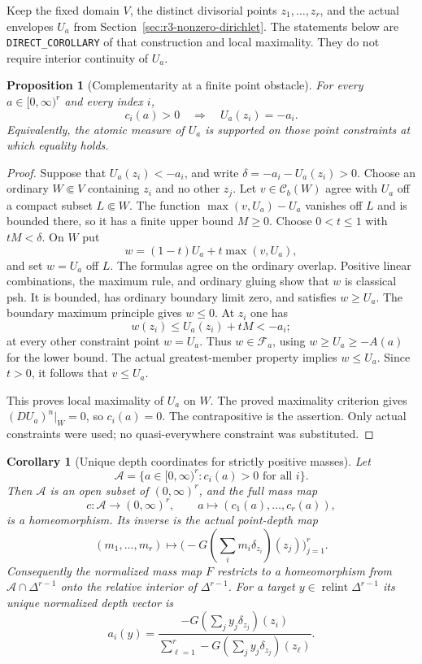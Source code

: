 \documentclass[11pt,a4paper]{article}
\numberwithin{equation}{section}
\newtheorem{proposition}[theorem]{Proposition}
\newtheorem{corollary}[theorem]{Corollary}
\theoremstyle{definition}
\theoremstyle{remark}
\newcommand{\Cb}{\mathcal C_b}
\begin{document}
Keep the fixed domain $V$, the distinct divisorial points
$z_1,\ldots,z_r$, and the actual envelopes $U_a$ from
Section~\ref{sec:r3-nonzero-dirichlet}. The statements below are
\texttt{DIRECT\_COROLLARY} of that construction and local maximality.
They do not require interior continuity of $U_a$.

\begin{proposition}[Complementarity at a finite point obstacle]
\label{prop:r3-atomic-complementarity}
For every $a\in[0,\infty)^r$ and every index $i$,
\[
 c_i(a)>0\quad\Longrightarrow\quad U_a(z_i)=-a_i.
\]
Equivalently, the atomic measure of $U_a$ is supported on those
point constraints at which equality holds.
\end{proposition}

\begin{proof}
Suppose that $U_a(z_i)<-a_i$, and write
$\delta=-a_i-U_a(z_i)>0$. Choose an ordinary
$W\Subset V$ containing $z_i$ and no other $z_j$. Let
$v\in\Cb(W)$ agree with $U_a$ off a compact subset
$L\Subset W$. The function $\max(v,U_a)-U_a$ vanishes off
$L$ and is bounded there, so it has a finite upper bound $M\geq0$.
Choose $0<t\leq1$ with $tM<\delta$. On $W$ put
\[
 w=(1-t)U_a+t\max(v,U_a),
\]
and set $w=U_a$ off $L$. The formulas agree on the ordinary
overlap. Positive linear combinations, the maximum rule, and
ordinary gluing show that $w$ is classical psh. It is bounded,
has ordinary boundary limit zero, and satisfies $w\geq U_a$.
The boundary maximum principle gives $w\leq0$.
At $z_i$ one has
\[
 w(z_i)\leq U_a(z_i)+tM<-a_i;
\]
at every other constraint point $w=U_a$. Thus
$w\in\mathcal F_a$, using $w\geq U_a\geq-A(a)$ for the
lower bound. The actual greatest-member property implies
$w\leq U_a$. Since $t>0$, it follows that $v\leq U_a$.

This proves local maximality of $U_a$ on $W$. The proved
maximality criterion gives $(DU_a)^n|_W=0$, so $c_i(a)=0$.
The contrapositive is the assertion. Only actual constraints
were used; no quasi-everywhere constraint was substituted.
\end{proof}

\begin{corollary}[Unique depth coordinates for strictly positive masses]
\label{cor:r3-active-mass-homeomorphism}
Let
\[
 \mathcal A=\{a\in[0,\infty)^r:c_i(a)>0\text{ for all }i\}.
\]
Then $\mathcal A$ is an open subset of $(0,\infty)^r$, and
the full mass map
\[
 c:\mathcal A\longrightarrow(0,\infty)^r,
 \qquad a\longmapsto(c_1(a),\ldots,c_r(a)),
\]
is a homeomorphism. Its inverse is the actual point-depth map
\[
 (m_1,\ldots,m_r)\longmapsto
 \bigl(-G(\textstyle\sum_i m_i\delta_{z_i})(z_j)\bigr)_{j=1}^r.
\]
Consequently the normalized mass map $F$ restricts to a
homeomorphism from $\mathcal A\cap\Delta^{r-1}$ onto the
relative interior of $\Delta^{r-1}$. For a target
$y\in\operatorname{relint}\Delta^{r-1}$ its unique normalized
depth vector is
\[
 a_i(y)=
 \frac{-G(\sum_jy_j\delta_{z_j})(z_i)}
 {\sum_{\ell=1}^r-G(\sum_jy_j\delta_{z_j})(z_\ell)}.
\]
\end{corollary}
\end{document}
